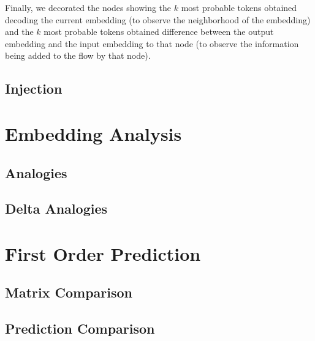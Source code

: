 Finally, we decorated the nodes showing the $k$ most probable tokens obtained decoding the current embedding (to observe the neighborhood of the embedding) and the $k$ most probable tokens obtained difference between the output embedding and the input embedding to that node (to observe the information being added to the flow by that node).

\subsection{Injection}

\section{Embedding Analysis}

\subsection{Analogies}
\subsection{Delta Analogies}

\section{First Order Prediction}

\subsection{Matrix Comparison}
\subsection{Prediction Comparison}